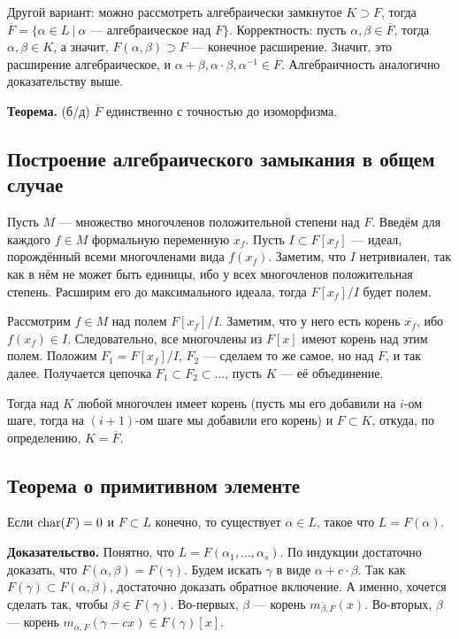 Другой вариант: можно рассмотреть алгебраически замкнутое $K \supset F$, тогда $\overline F = \{\alpha \in L~|~\text{$\alpha$ --- алгебраическое над $F$}\}$.
Корректность: пусть $\alpha, \beta \in \overline F$, тогда $\alpha, \beta \in K$, а значит, $F(\alpha, \beta) \supset F$ --- конечное расширение.
Значит, это расширение алгебраическое, и $\alpha + \beta, \alpha \cdot \beta, \alpha^{-1} \in \overline F$.
Алгебраичность аналогично доказательству выше.

\textbf{Теорема.} (б/д) $\overline F$ единственно с точностью до изоморфизма.

\subsection{Построение алгебраического замыкания в общем случае}
Пусть $M$ --- множество многочленов положительной степени над $F$.
Введём для каждого $f \in M$ формальную переменную $x_f$.
Пусть $I \subset F[x_f]$ --- идеал, порождённый всеми многочленами вида $f(x_f)$.
Заметим, что $I$ нетривиален, так как в нём не может быть единицы, ибо у всех многочленов положительная степень.
Расширим его до максимального идеала, тогда $F[x_f] / I$ будет полем.

Рассмотрим $f \in M$ над полем $F[x_f] / I$.
Заметим, что у него есть корень $\overline{x_f}$, ибо $f(x_f) \in I$.
Следовательно, все многочлены из $F[x]$ имеют корень над этим полем.
Положим $F_1 = F[x_f] / I$, $F_2$ --- сделаем то же самое, но над $F$, и так далее.
Получается цепочка $F_1 \subset F_2 \subset \dots$, пусть $K$ --- её объединение.

Тогда над $K$ любой многочлен имеет корень (пусть мы его добавили на $i$-ом шаге, тогда на $(i + 1)$-ом шаге мы добавили его корень) и $F \subset K$, откуда, по определению, $K = \overline F$.

\subsection{Теорема о примитивном элементе}
Если $\operatorname{char}(F) = 0$ и $F \subset L$ конечно, то существует $\alpha \in L$, такое что $L = F(\alpha)$.

\textbf{Доказательство.} Понятно, что $L = F(\alpha_1, \dots, \alpha_s)$.
По индукции достаточно доказать, что $F(\alpha, \beta) = F(\gamma)$.
Будем искать $\gamma$ в виде $\alpha + c \cdot \beta$.
Так как $F(\gamma) \subset F(\alpha, \beta)$, достаточно доказать обратное включение.
А именно, хочется сделать так, чтобы $\beta \in F(\gamma)$.
Во-первых, $\beta$ --- корень $m_{\beta, F}(x)$.
Во-вторых, $\beta$ --- корень $m_{\alpha, F}(\gamma - cx) \in F(\gamma)[x]$.

